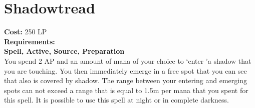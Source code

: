 \section{Shadowtread}\label{spell:shadowtread}
\textbf{Cost:} 250 LP\\
\textbf{Requirements:}\\
\textbf{Spell, Active, Source, Preparation}\\
You spend 2 AP and an amount of mana of your choice to \lq enter \rq a shadow that you are touching.
You then immediately emerge in a free spot that you can see that also is covered by shadow.
The range between your entering and emerging spots can not exceed a range that is equal to 1.5m per mana that you spent for this spell.
It is possible to use this spell at night or in complete darkness.\\